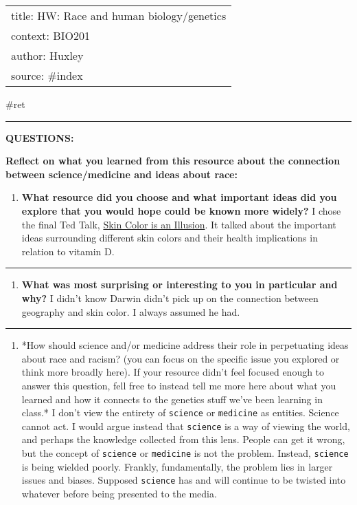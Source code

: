 \documentclass[letterpaper]{article}
\date{\today}
\title{}
\renewcommand{\tableofcontents}{}
\begin{document}
\tableofcontents

\begin{center}
\begin{tabular}{l}
title: HW: Race and human biology/genetics\\
context: BIO201\\
author: Huxley\\
source: \#index\\
\end{tabular}
\end{center}

\#ret

\noindent\rule{\textwidth}{0.5pt}

\textbf{QUESTIONS:}

\textbf{Reflect on what you learned from this resource about the connection
between science/medicine and ideas about race:}

\begin{enumerate}
\item \textbf{What resource did you choose and what important ideas did you
explore that you would hope could be known more widely?} I chose the
final Ted Talk, \href{https://www.youtube.com/watch?v=QOSPNVunyFQ}{Skin
Color is an Illusion}. It talked about the important ideas
surrounding different skin colors and their health implications in
relation to vitamin D.
\end{enumerate}

\noindent\rule{\textwidth}{0.5pt}

\begin{enumerate}
\item \textbf{What was most surprising or interesting to you in particular and
why?} I didn't know Darwin didn't pick up on the connection between
geography and skin color. I always assumed he had.
\end{enumerate}

\noindent\rule{\textwidth}{0.5pt}

\begin{enumerate}
\item *How should science and/or medicine address their role in
perpetuating ideas about race and racism? (you can focus on the
specific issue you explored or think more broadly here). If your
resource didn't feel focused enough to answer this question, fell
free to instead tell me more here about what you learned and how it
connects to the genetics stuff we've been learning in class.* I don't
view the entirety of \texttt{science} or \texttt{medicine} as entities. Science
cannot act. I would argue instead that \texttt{science} is a way of viewing
the world, and perhaps the knowledge collected from this lens. People
can get it wrong, but the concept of \texttt{science} or \texttt{medicine} is not
the problem. Instead, \texttt{science} is being wielded poorly. Frankly,
fundamentally, the problem lies in larger issues and biases. Supposed
\texttt{science} has and will continue to be twisted into whatever before
being presented to the media.
\end{enumerate}
\end{document}
